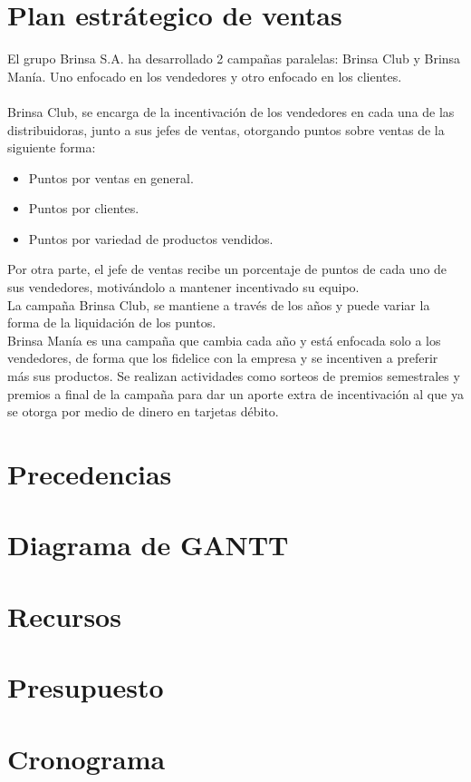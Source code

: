 \section{Plan estr\'ategico de ventas}
El grupo Brinsa S.A. ha desarrollado 2 campa\~nas paralelas: Brinsa Club y Brinsa Man\'ia. Uno enfocado en los vendedores y otro enfocado en los clientes.%
\\%
\\%
Brinsa Club, se encarga de la incentivaci\'on de los vendedores en cada una de las distribuidoras, junto a sus jefes de ventas, otorgando puntos sobre ventas de la siguiente forma:%
%
\begin{itemize}
	\item Puntos por ventas en general.
	\item Puntos por clientes.
	\item Puntos por variedad de productos vendidos.
\end{itemize}
%
Por otra parte, el jefe de ventas recibe un porcentaje de puntos de cada uno de sus vendedores, motiv\'andolo a mantener incentivado su equipo.%
\\%
La campa\~na Brinsa Club, se mantiene a trav\'es de los a\~nos y puede variar la forma de la liquidaci\'on de los puntos.%
\\%
Brinsa Man\'ia es una campa\~na que cambia cada a\~no y est\'a enfocada solo a los vendedores, de forma que los fidelice con la empresa y se incentiven a preferir m\'as sus productos. Se realizan actividades como sorteos de premios semestrales y premios a final de la campa\~na para dar un aporte extra de incentivaci\'on al que ya se otorga por medio de dinero en tarjetas d\'ebito.%
%
\newpage%
\section{Precedencias}
%
\newpage%
\section{Diagrama de GANTT}
%
\mbox{}
\newpage%
%
\mbox{}
\newpage%
%
\section{Recursos}
%
\mbox{}
\newpage%
\mbox{}
\newpage%
\mbox{}
\newpage%
\mbox{}
\newpage%
\section{Presupuesto}
%
\mbox{}
\newpage%
%
\mbox{}
\newpage%
%
\section{Cronograma}
%
\mbox{}
\newpage%
\mbox{}
\newpage%
\mbox{}
\newpage%
\mbox{}
\newpage%